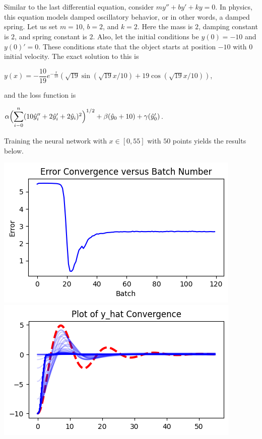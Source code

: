 \documentclass[12pt]{article}
\newcommand{\dsum}[2]{\mathlarger{\sum}_{#1}^{#2}}
\newcommand{\bgc}{\begin{center}}
\newcommand{\enc}{\end{center}}
\begin{document}
\begin{description}
\begin{minipage}{\linewidth}
    \end{minipage}
    \hfill \\
    \hline
    \hfill \\
    Similar to the last differential equation, consider $my'' + by' + ky = 0$.
    In physics, this equation models damped oscillatory behavior, or in other
    words, a damped spring. Let us set $m = 10$, $b = 2$, and $k = 2$. Here the
    mass is $2$, damping constant is $2$, and spring constant is $2$.  Also,
    let the initial conditions be $y(0) = -10$ and $y(0)' = 0$. These
    conditions state that the object starts at position $-10$ with $0$ initial
    velocity. The exact solution to this is 
    \bgc 
    $y(x) = -\dfrac{10}{19} e^{-\frac{x}{10}} (\sqrt{19}\sin(\sqrt{19}x/10) + 19\cos(\sqrt{19}x/10))$,
    \enc
    and the loss function is 
    \bgc 
    $\alpha\Bigl(\dsum{i-0}{n}(10\hat{y}_i'' + 2\hat{y}_i' + 2\hat{y}_i)^2\Bigr)^{1/2} 
    + \beta(\hat{y}_0 + 10)
    + \gamma(\hat{y}_0')$.
    \enc
    Training the neural network with $x\in[0, 55]$ with $50$ points yields the
    results below. \\ 
    \begin{minipage}{\linewidth}
        \centering
        \includegraphics[scale=.5]{images/figure13.png}
        \includegraphics[scale=.5]{images/figure14.png}

\end{minipage}
\end{description}
\end{document}

